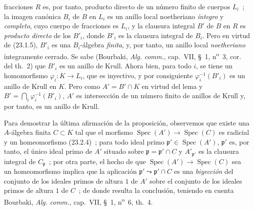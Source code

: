 \documentclass[10pt,oneside]{book}
\begin{document}
fracciones $R$ es, por tanto, producto directo de un número finito de cuerpos $L_i$~;
la imagen canónica $B_i$ de $B$ en $L_i$ es un anillo local noetheriano
\emph{íntegro} y \emph{completo}, cuyo cuerpo de fracciones es $L_i$, y la
clausura integral $B'$ de $B$ en $R$ es \emph{producto directo} de los
$B'_i$, donde $B'_i$ es la clausura integral de $B_i$. Pero en virtud de
(23.1.5), $B'_i$ es una $B_i$-álgebra \emph{finita}, y, por tanto, un anillo local
\emph{noetheriano} íntegramente cerrado. Se sabe (Bourbaki,
\emph{Alg. comm.}, cap.~VII, §~1, n\textsuperscript{o}~3, cor. del th.~2) que
$B'_i$ es un anillo de Krull. Ahora bien, para todo $i$, se tiene un homomorfismo
$\varphi_i:K\to L_i$, que es inyectivo, y por consiguiente
$\varphi_i^{-1}(B'_i)$ es un anillo de Krull en $K$. Pero como
$A'=B'\cap K$ en virtud del lema y
$B'=\bigcap_i\varphi_i^{-1}(B'_i)$, $A'$ es intersección de un número finito
de anillos de Krull y, por tanto, es un anillo de Krull.

Para demostrar la última afirmación de la proposición, observemos que existe una
$A$-álgebra finita $C\subset K$ tal que el morfismo
$\operatorname{Spec}(A')\to\operatorname{Spec}(C)$ es radicial y un
homeomorfismo (23.2.4)~; para todo ideal primo
$\mathfrak p'\in\operatorname{Spec}(A')$, $\mathfrak p'$ es, por tanto, el único
ideal primo de $A'$ situado sobre $\mathfrak p=\mathfrak p'\cap C$ y
$A'_{\mathfrak p'}$ es la clausura integral de $C_{\mathfrak p}$~; por otra parte,
el hecho de que $\operatorname{Spec}(A')\to\operatorname{Spec}(C)$ sea un
homeomorfismo implica que la aplicación
$\mathfrak p'\leadsto\mathfrak p'\cap C$ es una \emph{biyección} del conjunto de los
ideales primos de altura $1$ de $A'$ sobre el conjunto de los ideales primos de
altura $1$ de $C$~; de donde resulta la conclusión, teniendo en cuenta Bourbaki,
\emph{Alg. comm.}, cap.~VII, §~1, n\textsuperscript{o}~6, th.~4.
\end{document}
